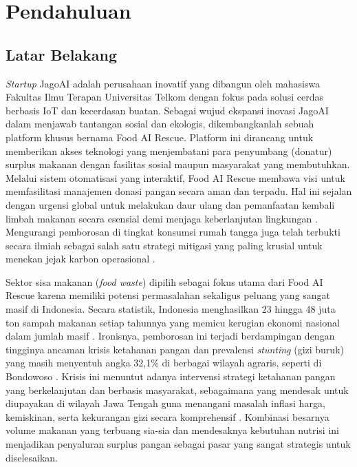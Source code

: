 
\chapter{Pendahuluan}
\label{chapter:pendahuluan}
\section{Latar Belakang}
\textit{Startup} JagoAI adalah perusahaan inovatif yang dibangun oleh mahasiswa Fakultas Ilmu Terapan Universitas Telkom dengan fokus pada solusi cerdas berbasis IoT dan kecerdasan buatan. Sebagai wujud ekspansi inovasi JagoAI dalam menjawab tantangan sosial dan ekologis, dikembangkanlah sebuah platform khusus bernama Food AI Rescue. Platform ini dirancang untuk memberikan akses teknologi yang menjembatani para penyumbang (donatur) surplus makanan dengan fasilitas sosial maupun masyarakat yang membutuhkan. Melalui sistem otomatisasi yang interaktif, Food AI Rescue membawa visi untuk memfasilitasi manajemen donasi pangan secara aman dan terpadu. Hal ini sejalan dengan urgensi global untuk melakukan daur ulang dan pemanfaatan kembali limbah makanan secara esensial demi menjaga keberlanjutan lingkungan \cite{raiEssentialRecyclingRepurposing2025a}. Mengurangi pemborosan di tingkat konsumsi rumah tangga juga telah terbukti secara ilmiah sebagai salah satu strategi mitigasi yang paling krusial untuk menekan jejak karbon operasional \cite{liuExploringHouseholdFood2023b}.

Sektor sisa makanan (\textit{food waste}) dipilih sebagai fokus utama dari Food AI Rescue karena memiliki potensi permasalahan sekaligus peluang yang sangat masif di Indonesia. Secara statistik, Indonesia menghasilkan 23 hingga 48 juta ton sampah makanan setiap tahunnya yang memicu kerugian ekonomi nasional dalam jumlah masif \cite{yulianaPotensiGerakanFood2022b}. Ironisnya, pemborosan ini terjadi berdampingan dengan tingginya ancaman krisis ketahanan pangan dan prevalensi \textit{stunting} (gizi buruk) yang masih menyentuh angka 32,1\% di berbagai wilayah agraris, seperti di Bondowoso \cite{prayitnoExploringRoleFood2025b}. Krisis ini menuntut adanya intervensi strategi ketahanan pangan yang berkelanjutan dan berbasis masyarakat, sebagaimana yang mendesak untuk diupayakan di wilayah Jawa Tengah guna menangani masalah inflasi harga, kemiskinan, serta kekurangan gizi secara komprehensif \cite{pujiyantoStrategiKetahananPangan2025b}. Kombinasi besarnya volume makanan yang terbuang sia-sia dan mendesaknya kebutuhan nutrisi ini menjadikan penyaluran surplus pangan sebagai pasar yang sangat strategis untuk diselesaikan.

